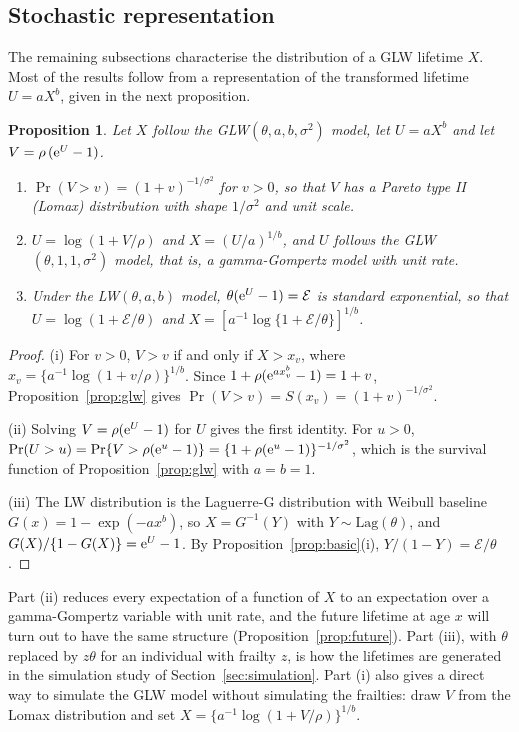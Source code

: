 \documentclass[12pt]{article}
\newcommand{\e}{{\rm e}}         %
\newcommand{\Lag}{\mathrm{Lag}}  %
\newcommand{\Exp}{\mathcal{E}}   %
\newtheorem{proposition}{Proposition}
\begin{document}
\subsection{Stochastic representation}

The remaining subsections characterise the distribution of a GLW lifetime $X$. Most of the results follow from a representation of the transformed lifetime $U=aX^b$, given in the next proposition.

\begin{proposition}\label{prop:repr}
Let $X$ follow the GLW$(\theta,a,b,\sigma^2)$ model, let $U=aX^b$ and let $V=\rho\,(\e^{U}-1)$.
\begin{enumerate}\renewcommand{\labelenumi}{(\roman{enumi})}
\item $\Pr(V>v)=(1+v)^{-1/\sigma^2}$ for $v>0$, so that $V$ has a Pareto type II (Lomax) distribution with shape $1/\sigma^2$ and unit scale.
\item $U=\log(1+V/\rho)$ and $X=(U/a)^{1/b}$, and $U$ follows the GLW$(\theta,1,1,\sigma^2)$ model, that is, a gamma-Gompertz model with unit rate.
\item Under the LW$(\theta,a,b)$ model, $\theta(\e^{U}-1)=\Exp$ is standard exponential, so that $U=\log(1+\Exp/\theta)$ and $X=[a^{-1}\log\{1+\Exp/\theta\}]^{1/b}$.
\end{enumerate}
\end{proposition}

\begin{proof}
(i) For $v>0$, $V>v$ if and only if $X>x_v$, where $x_v=\{a^{-1}\log(1+v/\rho)\}^{1/b}$. Since $1+\rho(\e^{ax_v^b}-1)=1+v$, Proposition~\ref{prop:glw} gives $\Pr(V>v)=S(x_v)=(1+v)^{-1/\sigma^2}$.

(ii) Solving $V=\rho(\e^{U}-1)$ for $U$ gives the first identity. For $u>0$, $\Pr(U>u)=\Pr\{V>\rho(\e^u-1)\}=\{1+\rho(\e^u-1)\}^{-1/\sigma^2}$, which is the survival function of Proposition~\ref{prop:glw} with $a=b=1$.

(iii) The LW distribution is the Laguerre-G distribution with Weibull baseline $G(x)=1-\exp(-ax^b)$, so $X=G^{-1}(Y)$ with $Y\sim\Lag(\theta)$, and $G(X)/\{1-G(X)\}=\e^{U}-1$. By Proposition~\ref{prop:basic}(i), $Y/(1-Y)=\Exp/\theta$.
\end{proof}

Part (ii) reduces every expectation of a function of $X$ to an expectation over a gamma-Gompertz variable with unit rate, and the future lifetime at age $x$ will turn out to have the same structure (Proposition~\ref{prop:future}). Part (iii), with $\theta$ replaced by $z\theta$ for an individual with frailty $z$, is how the lifetimes are generated in the simulation study of Section~\ref{sec:simulation}. Part (i) also gives a direct way to simulate the GLW model without simulating the frailties: draw $V$ from the Lomax distribution and set $X=\{a^{-1}\log(1+V/\rho)\}^{1/b}$.
\end{document}
